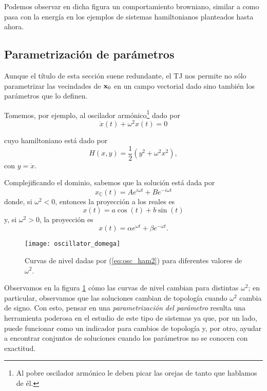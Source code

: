 Podemos observar en dicha figura un comportamiento browniano, similar a como pasa con la energía en los ejemplos de sistemas hamiltonianos planteados hasta ahora.


\subsection{Parametrización de parámetros}
\label{sec:parameter_variation}
Aunque el título de esta sección suene redundante, el TJ nos permite no sólo parametrizar las vecindades de $\mathbf{x}_0$ en un campo vectorial dado sino también los parámetros que lo definen.

Tomemos, por ejemplo, al oscilador armónico\footnote{Al pobre oscilador armónico le deben picar las orejas de tanto que hablamos de él.} dado por  
\begin{equation}
 \ddot{x}(t) + \omega^2 x(t) = 0
 \label{eq:one_dim_oscil}
\end{equation}

cuyo hamiltoniano está dado por 
\begin{equation}
 H(x,y) = \frac{1}{2} \left( y^2 + \omega ^2 x^2 \right),
 \label{eq:osc_ham2}
\end{equation}
con $y = \dot{x}$.

Complejificando el dominio, sabemos que la solución está dada por 
\begin{equation*}
 x_{\mathbb{C}}(t) = A e^{i\omega t} + B e^{-i \omega t}
\end{equation*}
donde, si $\omega^2 < 0$, entonces la proyección a los reales es
\begin{equation}
 x(t) = a \cos(t) + b \sin (t)
 \label{eq:ho_solution_trig}
\end{equation}
y, si $\omega^2 > 0$, la proyección es
\begin{equation}
 x(t) = \alpha e^{\omega t} + \beta e^{- \omega t}.
 \label{eq:ho_solution_exp}
\end{equation}

\begin{figure}[h!]
 \centering
 \texttt{[image: oscillator\_domega]}
 \caption{Curvas de nivel dadas por (\ref{eq:osc_ham2}) para diferentes valores de $\omega^2$.}
 \label{fig:oscillator_domega}
\end{figure}

Observamos en la figura \ref{fig:oscillator_domega} cómo las curvas de nivel cambian para distintas $\omega^2$; en particular, observamos que las soluciones cambian de topología cuando $\omega^2$ cambia de signo. Con esto, pensar en una \textit{parametrización del parámetro} resulta una herramienta poderosa en el estudio de este tipo de sistemas ya que, por un lado, puede funcionar como un indicador para cambios de topología y, por otro, ayudar a encontrar conjuntos de soluciones cuando los parámetros no se conocen con exactitud. 

